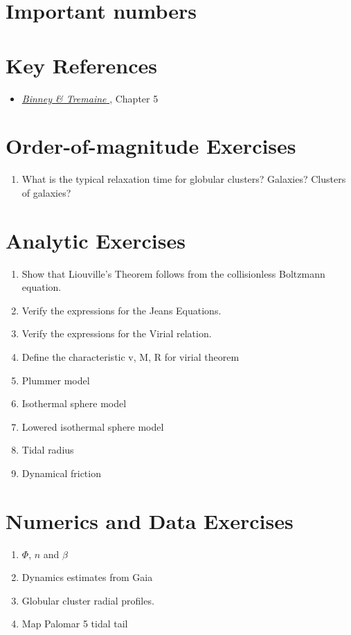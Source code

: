 \section{Important numbers}

\section{Key References}

\begin{itemize}
  \item
    \href{http://adsabs.harvard.edu/abs/2000asqu.book.....C}{
    {\it Binney \& Tremaine}
      \citet{cox00a}}, Chapter 5
\end{itemize}

\section{Order-of-magnitude Exercises}

\begin{enumerate} 
\item What is the typical relaxation time for globular clusters?
    Galaxies? Clusters of galaxies?
\end{enumerate}   

\section{Analytic Exercises}

\begin{enumerate}
\item Show that Liouville's Theorem follows from the collisionless
Boltzmann equation. 
\item Verify the expressions for the Jeans Equations. 
\item Verify the expressions for the Virial relation.
\item Define the characteristic v, M, R for virial theorem
\item Plummer model
\item Isothermal sphere model
\item Lowered isothermal sphere model
\item Tidal radius
\item Dynamical friction
\end{enumerate}

\section{Numerics and Data Exercises}

\begin{enumerate}

\item $\Phi$, $n$ and $\beta$
\item Dynamics estimates from Gaia
\item Globular cluster radial profiles.
\item Map Palomar 5 tidal tail
\end{enumerate}


  
